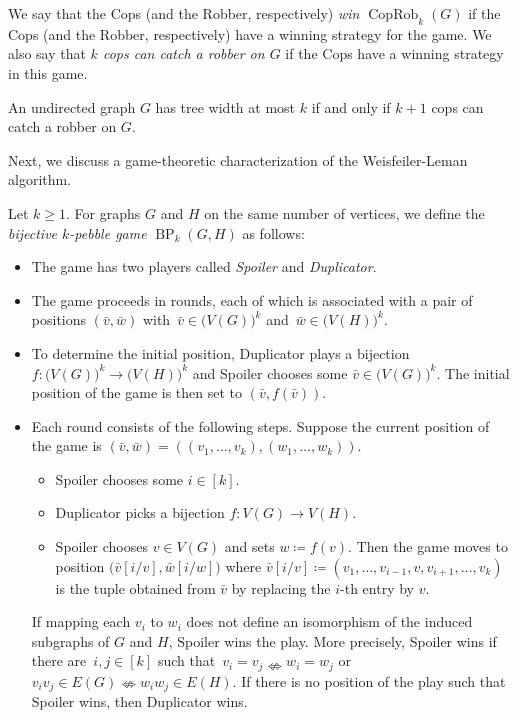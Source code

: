 \documentclass{theoretics}
\DeclareMathOperator{\CopRob}{CopRob}
\DeclareMathOperator{\BP}{BP}
\begin{document}
We say that the Cops (and the Robber, respectively) \emph{win $\CopRob_k(G)$} if the Cops (and the Robber, respectively) have a winning strategy for the game.
We also say that \emph{$k$ cops can catch a robber on $G$} if the Cops have a winning strategy in this game.

\begin{theorem}
 \label{thm:cops-and-robbers-characterization-of-treewidth}
 An undirected graph $G$ has tree width at most $k$ if and only if $k+1$ cops can catch a robber on $G$.
\end{theorem}

Next, we discuss a game-theoretic characterization of the Weisfeiler-Leman algorithm.

Let $k \geq 1$.
For graphs $G$ and $H$ on the same number of vertices, we define the \emph{bijective $k$-pebble game} $\BP_{k}(G,H)$ as follows:
\begin{itemize}
 \item The game has two players called \emph{Spoiler} and \emph{Duplicator}.
 \item The game proceeds in rounds, each of which is associated with a pair of positions
 $(\bar v,\bar w)$ with~$\bar v \in \big(V(G)\big)^k$ and~$\bar w \in \big(V(H)\big)^k$.
 \item To determine the initial position, Duplicator plays a bijection $f\colon \big(V(G)\big)^k \rightarrow \big(V(H)\big)^k$ and Spoiler chooses some $\bar v \in \big(V(G)\big)^k$.
  The initial position of the game is then set to $(\bar v,f(\bar v))$.
 \item Each round consists of the following steps.
  Suppose the current position of the game is $(\bar v,\bar w) = ((v_1,\ldots,v_k),(w_1,\ldots,w_k))$.
  \begin{itemize}
   \item[(S)] Spoiler chooses some $i \in [k]$.
   \item[(D)] Duplicator picks a bijection $f\colon V(G) \rightarrow V(H)$.
   \item[(S)] Spoiler chooses $v \in V(G)$ and sets $w \coloneqq f(v)$.
    Then the game moves to position $\big(\bar v[i/v], \bar w[i/w]\big)$ where $\bar v[i/v] \coloneqq (v_1,\dots,v_{i-1},v,v_{i+1},\dots,v_k)$ is the tuple obtained from $\bar v$ by replacing the $i$-th entry by $v$.
  \end{itemize}

  If mapping each $v_i$ to $w_i$ does not define an isomorphism of the induced subgraphs of $G$ and $H$, Spoiler wins the play.
  More precisely, Spoiler wins if there are~$i,j\in [k]$ such that~$v_i = v_j \nLeftrightarrow w_i =w_j$ or~$v_iv_j \in E(G) \nLeftrightarrow w_iw_j \in E(H)$.
  If there is no position of the play such that Spoiler wins, then Duplicator wins.
\end{itemize}
\end{document}
